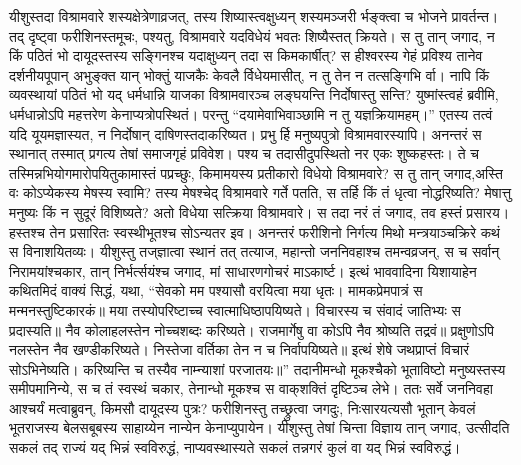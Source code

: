 \adhyAya
{}
\vakya यीशुस्तदा विश्रामवारे शस्यक्षेत्रेणाव्रजत्, तस्य शिष्यास्त्वक्षुध्यन् शस्यमञ्जरी र्भङ्क्त्वा च भोजने प्रावर्तन्त।
\vakya तद् दृष्ट्वा फरीशिनस्तमूचः, पश्यतु, विश्रामवारे यदविधेयं भवतः शिष्यैस्तत् क्रियते।
\vakya स तु तान् जगाद, न किं पठितं भो दायूदस्तस्य सङ्गिनश्च यदाक्षुध्यन् तदा स किमकार्षीत्?
\vakya स हीश्वरस्य गेहं प्रविश्य तानेव दर्शनीयपूपान् अभुङ्क्त यान् भोक्तुं याजकैः केवलै र्विधेयमासीत्, न तु तेन न तत्सङ्गिभि र्वा।
\vakya नापि किं व्यवस्थायां पठितं भो यद् धर्मधान्नि याजका विश्रामवारञ्च लङ्घयन्ति निर्दोषास्तु सन्ति?
\vakya युष्मांस्त्वहं ब्रवीमि, धर्मधान्नोऽपि महत्तरेण केनाप्यत्रोपस्थितं।
\vakya परन्तु “दयामेवाभिवाञ्छामि न तु यज्ञक्रियामहम्।” एतस्य तत्वं यदि यूयमज्ञास्यत, न निर्दोषान् दाषिणस्तदाकरिष्यत।
\vakya प्रभु र्हि मनुष्यपुत्रो विश्रामवारस्यापि।
\vakya अनन्तरं स स्थानात् तस्मात् प्रगत्य तेषां समाजगृहं प्रविवेश।
\vakya पश्य च तदासीदुपस्थितो नर एकः शुष्कहस्तः। ते च तस्मिन्नभियोगमारोपयितुकामास्तं पप्रच्छुः, किमामयस्य प्रतीकारो विधेयो विश्रामवारे?
\vakya स तु तान् जगाद,अस्ति वः कोऽप्येकस्य मेषस्य स्वामि? तस्य मेषश्चेद् विश्रामवारे गर्ते पतति, स तर्हि किं तं धृत्वा नोद्धरिष्यति?
\vakya मेषात्तु मनुष्यः किं न सुदूरं विशिष्यते? अतो विधेया सत्क्रिया विश्रामवारे।
\vakya स तदा नरं तं जगाद, तव हस्तं प्रसारय। हस्तश्च तेन प्रसारितः स्वस्थीभूतश्च सोऽन्यतर इव।
\vakya अनन्तरं फरीशिनो निर्गत्य मिथो मन्त्रयाञ्चक्रिरे कथं स विनाशयितव्यः।
\vakya यीशुस्तु तज्‌ज्ञात्वा स्थानं तत् तत्याज, महान्तो जननिवहाश्च तमन्वव्रजन्, स च सर्वान् निरामयांश्चकार, तान् निर्भर्त्सयंश्च जगाद,
\vakya मां साधारणगोचरं माऽकार्ष्ट।
\vakya इत्थं भाववादिना यिशायाहेन कथितमिदं वाक्यं सिद्धं, यथा,
\vakya “सेवको मम पश्यासौ वरयित्वा मया धृतः। मामकप्रेमपात्रं स मन्मनस्तुष्टिकारकं॥
\vakya मया तस्योपरिष्टाच्च स्वात्माधिष्ठापयिष्यते। विचारस्य च संवादं जातिभ्यः स प्रदास्यति॥ नैव कोलाहलस्तेन नोच्चशब्दः करिष्यते। राजमार्गेषु वा कोऽपि नैव श्रोष्यति तद्रवं॥
\vakya प्रक्षुणोऽपि नलस्तेन नैव खण्डीकरिष्यते। निस्तेजा वर्तिका तेन न च निर्वापयिष्यते॥
\vakya इत्थं शेषे जथप्राप्तं विचारं सोऽभिनेष्यति। करिष्यन्ति च तस्यैव नाम्न्याशां परजातयः॥”
\vakya तदानीमन्धो मूकश्चैको भूताविष्टो मनुष्यस्तस्य समीपमानिन्ये, स च तं स्वस्थं चकार, तेनान्धो मूकश्च स वाक्‌शक्तिं दृष्टिञ्च लेभे।
\vakya ततः सर्वे जननिवहा आश्चर्यं मत्वाब्रुवन्, किमसौ दायूदस्य पुत्रः?
\vakya फरीशिनस्तु तच्छ्रुत्वा जगदुः, निःसारयत्यसौ भूतान् केवलं भूतराजस्य बेलसबूबस्य साहाय्येन नान्येन केनाप्युपायेन।
\vakya यीशुस्तु तेषां चिन्ता विज्ञाय तान् जगाद, उत्सीदति सकलं तद् राज्यं यद् भिन्नं स्वविरुद्धं, नाप्यवस्थास्यते सकलं तन्नगरं कुलं वा यद् भिन्नं स्वविरुद्धं।
